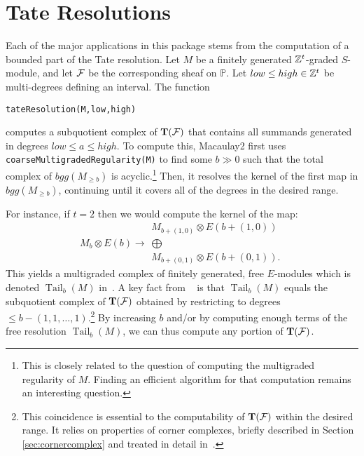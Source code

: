 \documentclass[twoside,12pt, leqno]{amsart}
\def\PP{{\mathbb P}}
\def\bT{{\bf T}}
\begin{document}


\section{Tate Resolutions}\label{sec:tate resolutions}
Each of the major applications in this package stems from the computation of a bounded part of the Tate resolution.
Let $M$ be a finitely generated ${\mathbb Z}^t$-graded $S$-module, and let ${\mathcal F}$ be the 
corresponding sheaf on $\PP$. Let
$low\leq high\in {\mathbb Z}^t$ be multi-degrees defining an interval.  The function
\begin{verbatim}
tateResolution(M,low,high)
\end{verbatim}
computes a subquotient complex of $\bT(\sF)$ that contains all summands generated in degrees $low\leq a \leq  high$.  To compute this, Macaulay2 first uses  {\tt coarseMultigradedRegularity(M)} to find some $b\gg 0$ such that the total complex of $bgg(M_{\geq b})$ is acyclic.\footnote{This is closely related to the question of computing the multigraded regularity of $M$. Finding an efficient algorithm for that computation remains an interesting question.}  Then, it resolves the kernel of  the first map in $bgg(M_{\geq b})$, continuing until it covers all of the degrees in the desired range.  

For instance, if $t=2$ then we would compute the kernel of the map:
\[
M_b \otimes E(b) \to 
\begin{matrix}
M_{b+(1,0)} \otimes E(b+(1,0))\\
\bigoplus
\\
M_{b+(0,1)} \otimes E(b+(0,1)).
\end{matrix}
\]
This yields a multigraded complex of finitely generated, free $E$-modules which is denoted $\operatorname{Tail}_b(M)$ in~\cite[\S1]{EES}.  A key fact from ~\cite[\S1]{EES} is that $\operatorname{Tail}_b(M)$ equals the subquotient complex of $\bT(\sF)$ obtained by restricting to degrees $\leq b - (1,1,\dots,1)$.\footnote{This coincidence is essential to the computability of $\bT(\sF)$ within the desired range.  It relies on properties of corner complexes, briefly described in Section \ref{sec:cornercomplex} and treated in detail in~\cite[\S3]{EES}.}
 By increasing $b$ and/or by computing enough terms of the free resolution $\operatorname{Tail}_b(M)$, we can thus compute any portion of $\bT(\sF)$.  
\end{document}
